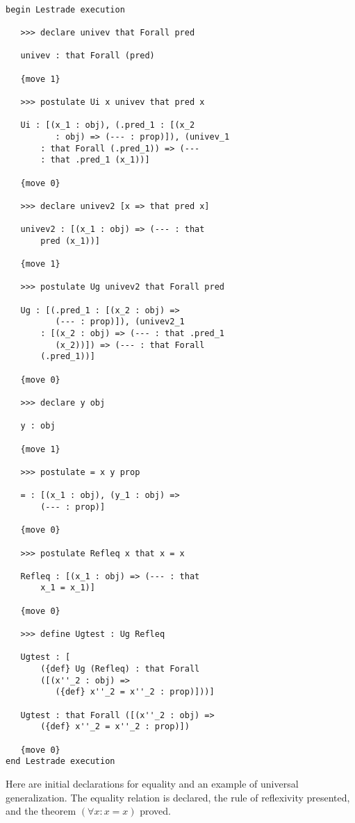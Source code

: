 \documentclass[12pt]{article}
\begin{document}
\begin{verbatim}

begin Lestrade execution

   >>> declare univev that Forall pred

   univev : that Forall (pred)

   {move 1}

   >>> postulate Ui x univev that pred x

   Ui : [(x_1 : obj), (.pred_1 : [(x_2 
          : obj) => (--- : prop)]), (univev_1 
       : that Forall (.pred_1)) => (--- 
       : that .pred_1 (x_1))]

   {move 0}

   >>> declare univev2 [x => that pred x]

   univev2 : [(x_1 : obj) => (--- : that 
       pred (x_1))]

   {move 1}

   >>> postulate Ug univev2 that Forall pred

   Ug : [(.pred_1 : [(x_2 : obj) => 
          (--- : prop)]), (univev2_1 
       : [(x_2 : obj) => (--- : that .pred_1 
          (x_2))]) => (--- : that Forall 
       (.pred_1))]

   {move 0}

   >>> declare y obj

   y : obj

   {move 1}

   >>> postulate = x y prop

   = : [(x_1 : obj), (y_1 : obj) => 
       (--- : prop)]

   {move 0}

   >>> postulate Refleq x that x = x

   Refleq : [(x_1 : obj) => (--- : that 
       x_1 = x_1)]

   {move 0}

   >>> define Ugtest : Ug Refleq

   Ugtest : [
       ({def} Ug (Refleq) : that Forall 
       ([(x''_2 : obj) => 
          ({def} x''_2 = x''_2 : prop)]))]

   Ugtest : that Forall ([(x''_2 : obj) => 
       ({def} x''_2 = x''_2 : prop)])

   {move 0}
end Lestrade execution
\end{verbatim}

Here are initial declarations for equality and an example of universal generalization.  The equality relation is declared, the rule of reflexivity presented, 
and the theorem $(\forall x:x=x)$ proved.
\end{document}
